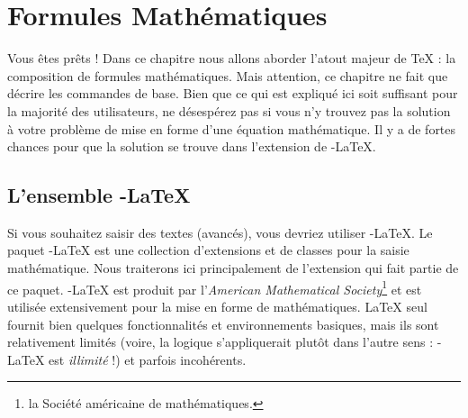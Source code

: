 %
%
%
%



\chapter{Formules Mathématiques}
\thispagestyle{plain}

\begin{intro}
  Vous êtes prêts ! Dans ce chapitre nous allons aborder l'atout
  majeur de \TeX{} : la composition de formules mathématiques.
  Mais attention, ce chapitre ne fait que décrire les commandes de
  base. Bien que ce qui est expliqué ici soit suffisant pour la
  majorité des utilisateurs, ne désespérez pas si vous n'y trouvez pas
  la solution à votre problème de mise en forme d'une équation
  mathématique. Il y a de fortes chances pour que la solution se
  trouve dans l'extension  de \AmS-\LaTeX{}.%
\end{intro}

\section{L'ensemble \texorpdfstring{\AmS}{AMS}-\LaTeX{}}

Si vous souhaitez saisir des textes  (avancés), vous
devriez utiliser \AmS-\LaTeX{}. Le paquet \AmS-\LaTeX{} est une
collection d'extensions et de classes pour la saisie
mathématique. Nous traiterons ici principalement de l'extension
 qui fait partie de ce paquet. \AmS-\LaTeX{} est produit
par l'\emph{American Mathematical Society}\footnote{la Société
  américaine de mathématiques. \NdT} et est utilisée extensivement pour la
mise en forme de mathématiques. \LaTeX{} seul fournit bien quelques
fonctionnalités et environnements basiques, mais ils sont
relativement limités (voire, la logique s'appliquerait plutôt dans
l'autre sens : \AmS-\LaTeX{} est \emph{illimité} !) et parfois
incohérents.


